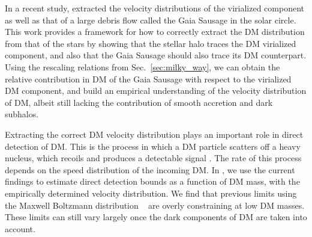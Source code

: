 \documentclass[twocolumn,preprintnumbers]{aastex6}
\DeclareRobustCommand{\Sec}[1]{Sec.~\ref{#1}}
\begin{document}
In a recent study, \cite{necib2018} extracted the velocity distributions of the virialized component as well as that of a large debris flow called the Gaia Sausage in the solar circle. This work provides a framework for how to correctly extract the DM distribution from that of the stars by showing that the stellar halo traces the DM virialized component, and also that the Gaia Sausage should also trace its DM counterpart. Using the rescaling relations from \Sec{sec:milky_way}, we can obtain the relative contribution in DM of the Gaia Sausage with respect to the virialized DM component, and build an empirical understanding of the velocity distribution of DM, albeit still lacking the contribution of smooth accretion and dark subhalos.



Extracting the correct DM velocity distribution plays an important role in direct detection of DM. This is the process in which a DM particle scatters off a heavy nucleus, which recoils and produces a detectable signal \citep{Goodman:1984dc}. The rate of this process depends on the speed distribution of the incoming DM. In \cite{necib2018}, we use the current findings to estimate direct detection bounds as a function of DM mass, with the empirically determined velocity distribution. We find that previous limits using the Maxwell Boltzmann distribution ~\citep{Drukier:1986tm,Freese:1987wu} are overly constraining at low DM masses. These limits can still vary largely once the dark components of DM are taken into account.
\end{document}
